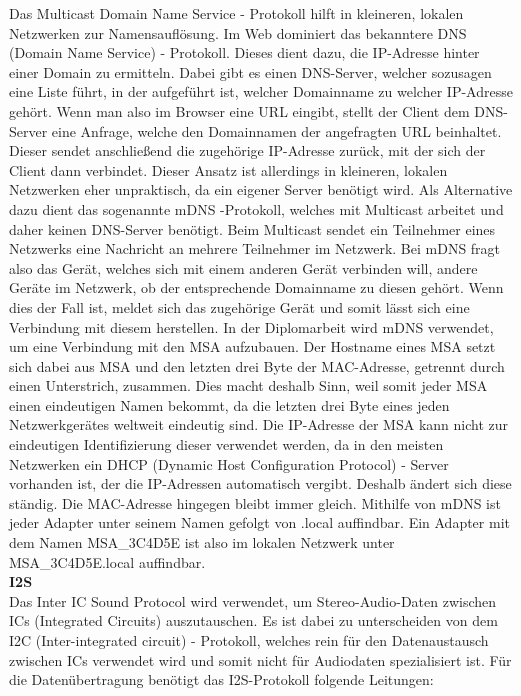 \documentclass[11pt, twoside]{article}
\begin{document}
Das Multicast Domain Name Service - Protokoll hilft in kleineren, lokalen Netzwerken zur Namensauflösung. Im Web dominiert das bekanntere DNS (Domain Name Service) - Protokoll. Dieses dient dazu, die IP-Adresse hinter einer Domain zu ermitteln. Dabei gibt es einen DNS-Server, welcher sozusagen eine Liste führt, in der aufgeführt ist, welcher Domainname zu welcher IP-Adresse gehört. Wenn man also im Browser eine URL eingibt, stellt der Client dem DNS-Server eine Anfrage, welche den Domainnamen der angefragten URL beinhaltet. Dieser sendet anschließend die zugehörige IP-Adresse zurück, mit der sich der Client dann verbindet. Dieser Ansatz ist allerdings in kleineren, lokalen Netzwerken eher unpraktisch, da ein eigener Server benötigt wird. Als Alternative dazu dient das sogenannte mDNS -Protokoll, welches mit Multicast arbeitet und daher keinen DNS-Server benötigt. Beim Multicast sendet ein Teilnehmer eines Netzwerks eine Nachricht an mehrere Teilnehmer im Netzwerk. Bei mDNS fragt also das Gerät, welches sich mit einem anderen Gerät verbinden will, andere Geräte im Netzwerk, ob der entsprechende Domainname zu diesen gehört. Wenn dies der Fall ist, meldet sich das zugehörige Gerät und somit lässt sich eine Verbindung mit diesem herstellen. \parencite[vgl.][]{noauthor_urlpi19_2022} In der Diplomarbeit wird mDNS verwendet, um eine Verbindung mit den MSA aufzubauen. Der Hostname eines MSA setzt sich dabei aus \glqq MSA \grqq{} und den letzten drei Byte der MAC-Adresse, getrennt durch einen Unterstrich, zusammen. Dies macht deshalb Sinn, weil somit jeder MSA einen eindeutigen Namen bekommt, da die letzten drei Byte eines jeden Netzwerkgerätes weltweit eindeutig sind. Die IP-Adresse der MSA kann nicht zur eindeutigen Identifizierung dieser verwendet werden, da in den meisten Netzwerken ein DHCP (Dynamic Host Configuration Protocol) - Server vorhanden ist, der die IP-Adressen automatisch vergibt. Deshalb ändert sich diese ständig. Die MAC-Adresse hingegen bleibt immer gleich. \parencite[vgl.][]{noauthor_urlpi20_nodate} Mithilfe von mDNS ist jeder Adapter unter seinem Namen gefolgt von \glqq .local \grqq{} auffindbar. Ein Adapter mit dem Namen \glqq MSA\_3C4D5E \grqq{} ist also im lokalen Netzwerk unter \glqq MSA\_3C4D5E.local \grqq{} auffindbar.
\newline \\
\textbf{I2S}\\
Das \glqq Inter IC Sound Protocol \grqq{} wird verwendet, um Stereo-Audio-Daten zwischen ICs (Integrated Circuits) auszutauschen. Es ist dabei zu unterscheiden von dem I2C (Inter-integrated circuit) - Protokoll, welches rein für den Datenaustausch zwischen ICs verwendet wird und somit nicht für Audiodaten spezialisiert ist. Für die Datenübertragung benötigt das I2S-Protokoll folgende Leitungen:
\end{document}
